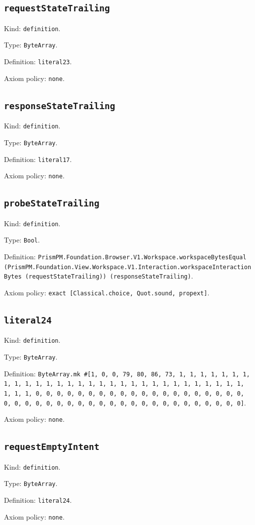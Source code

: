 \documentclass[11pt]{article}
\begin{document}
\subsection*{\texttt{requestStateTrailing}}
\noindent Kind: \texttt{definition}.\par
\noindent Type: \texttt{ByteArray}.\par
\noindent Definition: \texttt{literal23}.\par
\noindent Axiom policy: \texttt{none}.\par
\subsection*{\texttt{responseStateTrailing}}
\noindent Kind: \texttt{definition}.\par
\noindent Type: \texttt{ByteArray}.\par
\noindent Definition: \texttt{literal17}.\par
\noindent Axiom policy: \texttt{none}.\par
\subsection*{\texttt{probeStateTrailing}}
\noindent Kind: \texttt{definition}.\par
\noindent Type: \texttt{Bool}.\par
\noindent Definition: \texttt{PrismPM.Foundation.Browser.V1.Workspace.workspaceBytesEqual (PrismPM.Foundation.View.Workspace.V1.Interaction.workspaceInteractionBytes (requestStateTrailing)) (responseStateTrailing)}.\par
\noindent Axiom policy: \texttt{exact [Classical.choice, Quot.sound, propext]}.\par
\subsection*{\texttt{literal24}}
\noindent Kind: \texttt{definition}.\par
\noindent Type: \texttt{ByteArray}.\par
\noindent Definition: \texttt{ByteArray.mk \#[1, 0, 0, 79, 80, 86, 73, 1, 1, 1, 1, 1, 1, 1, 1, 1, 1, 1, 1, 1, 1, 1, 1, 1, 1, 1, 1, 1, 1, 1, 1, 1, 1, 1, 1, 1, 1, 1, 1, 1, 0, 0, 0, 0, 0, 0, 0, 0, 0, 0, 0, 0, 0, 0, 0, 0, 0, 0, 0, 0, 0, 0, 0, 0, 0, 0, 0, 0, 0, 0, 0, 0, 0, 0, 0, 0, 0, 0, 0, 0, 0, 0, 0]}.\par
\noindent Axiom policy: \texttt{none}.\par
\subsection*{\texttt{requestEmptyIntent}}
\noindent Kind: \texttt{definition}.\par
\noindent Type: \texttt{ByteArray}.\par
\noindent Definition: \texttt{literal24}.\par
\noindent Axiom policy: \texttt{none}.\par
\end{document}
